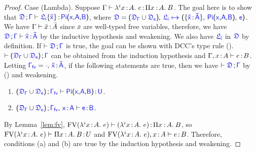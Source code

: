 \begin{theorem}
\begin{proof}
Case (Lambda). \hspace{0.4cm}
Suppose $\Gamma \vdash \lambda^{i}x\hspace{0.5mm}{:}\hspace{0.5mm} A.\ e \hspace{0.5mm}{:}\hspace{0.5mm} \Pi x\mkern1.5mu{\hspace{0.5mm}{:}\hspace{0.5mm}} A.\hspace{0.8mm}B$.
The goal here is to show that $\targetcon \vdash \targetlab{\flabel_i}{\bar{x}} \goodcolon \targetpi{x}{A}{B}$, where 
$\target{\fdef} = \sfpl \target{\fdef_{\Gamma}} \cup \target{\fdef_e}\sfpr \sfcomma 
\itemdef{\target{\flabel_i}}{\itemtype{\bar{x}}{\bar{A}}}{\targetpi{x}{A}{B}}{\target{e}}$. We have
$\Gamma \vdash \bar{x} \hspace{0.5mm}{:}\hspace{0.5mm} \bar{A}$ since $\bar{x}$ are well-typed free variables, therefore, we have 
$\targetcon \vdash \itemtype{\bar{x}}{\bar{A}}$ by the inductive hypothesis and weakening. We also have $\target{\flabel_i}$ in $\target{\fdef}$ by definition.
If $\vdash \targetcon$ is true, the goal can be shown with DCC's type rule (). $\vdash \sfpl \target{\fdef_{\Gamma}} \cup \target{\fdef_e}\sfpr \semicolon \target{\Gamma}$ can be obtained from the induction hypothesis and $\Gamma, x \hspace{0.5mm}{:}\hspace{0.5mm} A \vdash e \hspace{0.5mm}{:}\hspace{0.5mm} B$. Letting 
$\target{\Gamma_{fv}} = \target{\cdot}\sfcomma\itemtype{\bar{x}}{\bar{A}}$, if the following statements are true, then	 we have $\vdash \targetcon$ by () and weakening.
\begin{enumerate}[label=(\alph*)]
\item $\sfpl \target{\fdef_{\Gamma}} \cup \target{\fdef_e}\sfpr \semicolon \target{\Gamma_{fv}} \vdash \targetpi{x}{A}{B} \goodcolon \target{U} $.
\item $\sfpl \target{\fdef_{\Gamma}} \cup \target{\fdef_e}\sfpr \semicolon \target{\Gamma_{fv}} \sfcomma \itemtype{x}{A} \vdash \target{e} \goodcolon \target{B} $.
\end{enumerate}
By Lemma~\ref{lem:fv}, $\text{FV}(\lambda^{i}x\hspace{0.5mm}{:}\hspace{0.5mm} A.\ e) \vdash (\lambda^{i}x\hspace{0.5mm}{:}\hspace{0.5mm} A.\ e) \hspace{0.5mm}{:}\hspace{0.5mm} \Pi x\mkern1.5mu{\hspace{0.5mm}{:}\hspace{0.5mm}} A.\hspace{0.8mm}B$, so $\text{FV}(\lambda^{i}x\hspace{0.5mm}{:}\hspace{0.5mm} A.\ e) \vdash \Pi x\mkern1.5mu{\hspace{0.5mm}{:}\hspace{0.5mm}} A.\hspace{0.8mm}B \hspace{0.5mm}{:}\hspace{0.5mm} U$ and
$\text{FV}(\lambda^{i}x\hspace{0.5mm}{:}\hspace{0.5mm} A.\ e), x \hspace{0.5mm}{:}\hspace{0.5mm} A \vdash e \hspace{0.5mm}{:}\hspace{0.5mm} B$. Therefore, conditions (a) and (b) are true by the induction hypothesis and weakening.
\end{proof}
\end{theorem}